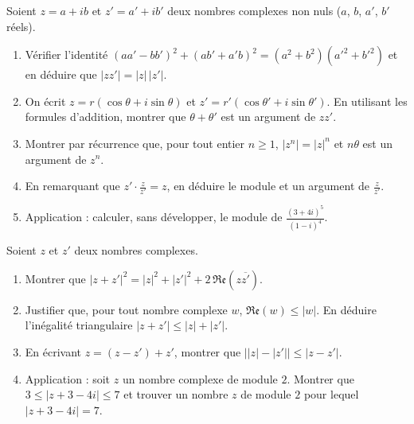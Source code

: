 %
\begin{exo}
	Soient $z = a + ib$ et $z' = a' + ib'$ deux nombres complexes non nuls ($a$, $b$, $a'$, $b'$ r\'eels).
	\begin{enumerate}
		\item V\'erifier l'identit\'e $(aa' - bb')^2 + (ab' + a'b)^2 = (a^2 + b^2)(a'^2 + b'^2)$
		      et en d\'eduire que $|z z'| = |z| \, |z'|$.
		\item On \'ecrit $z = r(\cos\theta + i\sin\theta)$ et $z' = r'(\cos\theta' + i\sin\theta')$.
		      En utilisant les formules d'addition, montrer que $\theta + \theta'$ est un argument de $zz'$.
		\item Montrer par r\'ecurrence que, pour tout entier $n \geq 1$, $|z^n| = |z|^n$ et $n\theta$ est un argument de $z^n$.
		\item En remarquant que $z' \cdot \frac{z}{z'} = z$, en d\'eduire le module et un argument de $\frac{z}{z'}$.
		\item Application : calculer, sans d\'evelopper, le module de $\frac{(3+4i)^5}{(1-i)^4}$.
	\end{enumerate}
\end{exo}
%
\begin{exo}
	Soient $z$ et $z'$ deux nombres complexes.
	\begin{enumerate}
		\item Montrer que $|z + z'|^2 = |z|^2 + |z'|^2 + 2\,\mathfrak{Re}\left(z \overline{z'}\right)$.
		\item Justifier que, pour tout nombre complexe $w$, $\mathfrak{Re}(w) \leq |w|$.
		      En d\'eduire l'in\'egalit\'e triangulaire $|z + z'| \leq |z| + |z'|$.
		\item En \'ecrivant $z = (z - z') + z'$, montrer que $\left| |z| - |z'| \right| \leq |z - z'|$.
		\item Application : soit $z$ un nombre complexe de module $2$.
		      Montrer que $3 \leq |z + 3 - 4i| \leq 7$ et trouver un nombre $z$ de module $2$ pour lequel $|z + 3 - 4i| = 7$.
	\end{enumerate}
\end{exo}
%
